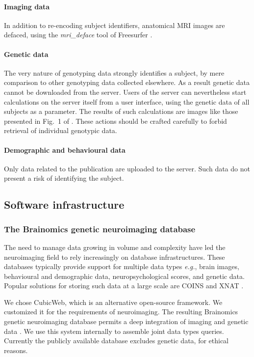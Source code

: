 \documentclass[preprint,review,12pt]{elsarticle}
\begin{document}
\paragraph{Imaging data} In addition to re-encoding subject identifiers, anatomical MRI images are defaced, using the \textit{mri\_deface} tool of Freesurfer \cite{Fischl2012}.

\paragraph{Genetic data} The very nature of genotyping data strongly identifies a subject, by mere comparison to other genotyping data collected elsewhere. As a result genetic data cannot be downloaded from the server. Users of the server can nevertheless start calculations on the server itself from a user interface, using the genetic data of all subjects as a parameter. The results of such calculations are images like those presented in Fig.~1 of \cite{Pinel2012}. These actions should be crafted carefully to forbid retrieval of individual genotypic data.

\paragraph{Demographic and behavioural data} Only data related to the publication \cite{Pinel2007} are uploaded to the server. Such data do not present a risk of identifying the subject.


\subsection{Software infrastructure}

\subsubsection{The Brainomics genetic neuroimaging database}

The need to manage data growing in volume and complexity have led the neuroimaging field to rely increasingly on database infrastructures. These databases typically provide support for multiple data types \textit{e.g.}, brain images, behavioural and demographic data, neuropsychological scores, and genetic data. Popular solutions for storing such data at a large scale are COINS \cite{COINS2011} and XNAT \cite{XNAT2007}.

We chose CubicWeb, which is an alternative open-source framework. We customized it for the requirements of neuroimaging. The resulting Brainomics genetic neuroimaging database permits a deep integration of imaging and genetic data \cite{HBM2013}. We use this system internally to assemble joint data types queries. Currently the publicly available database excludes genetic data, for ethical reasons.
\end{document}
